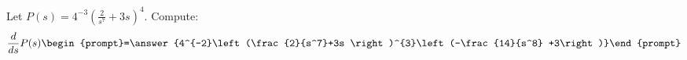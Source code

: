 \documentclass{ximera}
\author{Bart Snapp\and Nela lakos}
\begin{document}
\begin{exercise}
Let $P(s) =4^{-3}\left(\frac{2}{s^7}+3s \right)^{4}$. Compute:
\[
\frac{d}{ds}P(s)
\begin{prompt}=\answer{4^{-2}\left(\frac{2}{s^7}+3s \right)^{3}\left(-\frac{14}{s^8} +3\right)}\end{prompt}
\]
\end{exercise}
\end{document}
